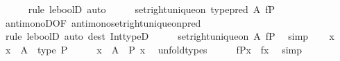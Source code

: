 \begin{isabellebody}
\ \ \ \ \isamarkupfalse%
\ {\isacharparenleft}{\kern0pt}rule\ le{\isacharunderscore}{\kern0pt}boolD{\isacharprime}{\kern0pt}{\isacharprime}{\kern0pt}{\isacharparenright}{\kern0pt}\ auto\isanewline
\ \ \isamarkupfalse%
\ \isamarkupfalse%
\ {\isachardoublequoteopen}set{\isacharunderscore}{\kern0pt}right{\isacharunderscore}{\kern0pt}unique{\isacharunderscore}{\kern0pt}on\ {\isacharparenleft}{\kern0pt}type{\isacharunderscore}{\kern0pt}pred\ {\isacharquery}{\kern0pt}A{\isacharprime}{\kern0pt}{\isacharparenright}{\kern0pt}\ f{\isasymrestriction}\isactrlbsub P\isactrlesub {\isachardoublequoteclose}\isanewline
\ \ \ \ \isamarkupfalse%
\ antimonoD{\isacharbrackleft}{\kern0pt}OF\ antimono{\isacharunderscore}{\kern0pt}set{\isacharunderscore}{\kern0pt}right{\isacharunderscore}{\kern0pt}unique{\isacharunderscore}{\kern0pt}on{\isacharunderscore}{\kern0pt}pred{\isacharbrackright}{\kern0pt}\isanewline
\ \ \ \ \isamarkupfalse%
\ {\isacharparenleft}{\kern0pt}rule\ le{\isacharunderscore}{\kern0pt}boolD{\isacharprime}{\kern0pt}{\isacharprime}{\kern0pt}{\isacharparenright}{\kern0pt}\ {\isacharparenleft}{\kern0pt}auto\ dest{\isacharcolon}{\kern0pt}\ Int{\isacharunderscore}{\kern0pt}typeD{}{\isacharparenright}{\kern0pt}\isanewline
\ \ \isamarkupfalse%
\ \isamarkupfalse%
\ {\isachardoublequoteopen}set{\isacharunderscore}{\kern0pt}right{\isacharunderscore}{\kern0pt}unique{\isacharunderscore}{\kern0pt}on\ {\isacharquery}{\kern0pt}A{\isacharprime}{\kern0pt}\ f{\isasymrestriction}\isactrlbsub P\isactrlesub {\isachardoublequoteclose}\ \isamarkupfalse%
\ simp\isanewline
\ \ \isamarkupfalse%
\ x\ \isamarkupfalse%
\ {\isachardoublequoteopen}x\ {\isacharcolon}{\kern0pt}\ A\ {\isacharampersand}{\kern0pt}\ type\ P{\isachardoublequoteclose}\isanewline
\ \ \isamarkupfalse%
\ \isamarkupfalse%
\ {\isachardoublequoteopen}x\ {\isacharcolon}{\kern0pt}\ A{\isachardoublequoteclose}\ \ {\isachardoublequoteopen}P\ x{\isachardoublequoteclose}\ \isamarkupfalse%
\ unfold{\isacharunderscore}{\kern0pt}types\isanewline
\ \ \isamarkupfalse%
\ \isamarkupfalse%
\ {\isachardoublequoteopen}f{\isasymrestriction}\isactrlbsub P\isactrlesub {\isacharbackquote}{\kern0pt}x\ {\isacharequal}{\kern0pt}\ f{\isacharbackquote}{\kern0pt}x{\isachardoublequoteclose}\ \isamarkupfalse%
\ simp\isanewline
\ \ \isamarkupfalse%

\end{isabellebody}

